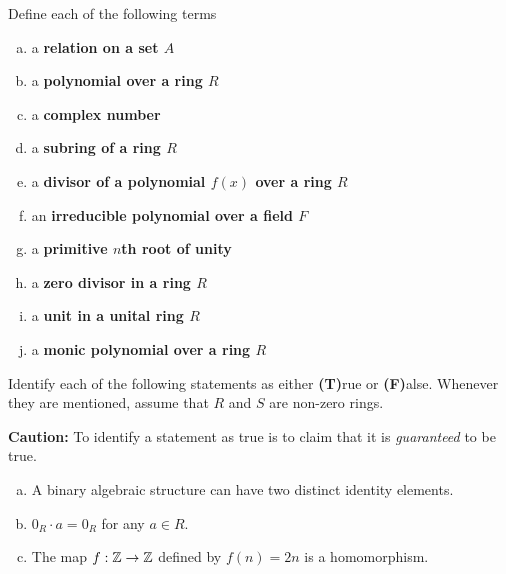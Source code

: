 \documentclass[11pt]{exam}
\begin{document}
\begin{questions}
\question[10] Define each of the following terms

\begin{enumerate}[(a)]
\item a \bf relation \md on a set $A$
\vfill

\item a \bf polynomial \md over a ring $R$
\vfill

\item a \bf complex number \md
\vfill

\item a \bf subring \md of a ring $R$
\vfill

\item a \bf divisor \md of a polynomial $f(x)$ over a ring $R$
\vfill
\newpage

\item an \bf irreducible \md polynomial over a field $F$
\vfill

\item a \bf primitive $n$th root of unity\md
\vfill

\item a \bf zero divisor \md in a ring $R$
\vfill

\item a \bf unit \md in a unital ring $R$
\vfill

\item a \bf monic \md polynomial over a ring $R$
\vfill

\end{enumerate}
\newpage

\question[6] Identify each of the following statements as either \textbf{(T)}rue or \textbf{(F)}alse.  Whenever they are mentioned, assume that $R$ and $S$ are non-zero rings.

\noindent \textbf{Caution:} To identify a statement as true is to claim that it is \emph{guaranteed} to be true.
\vsp

\begin{enumerate}[(a)]
\item \underline{\hspace{1cm}} A binary algebraic structure can have two distinct identity elements.
\vsp

\item \underline{\hspace{1cm}} $0_{R}\cdot a = 0_{R}$ for any $a\in R$.
\vsp

\item \underline{\hspace{1cm}} The map $f:\mathbb{Z}\to \mathbb{Z}$ defined by $f(n) = 2n$ is a homomorphism.
\vsp


\end{enumerate}
\end{questions}
\end{document}
